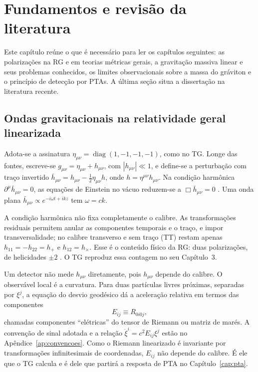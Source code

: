 \chapter{Fundamentos e revisão da literatura}
\label{cap:fundamentos}

Este capítulo reúne o que é necessário para ler os capítulos seguintes:
as polarizações na RG e em teorias métricas gerais, a gravitação
massiva linear e seus problemas conhecidos, os limites observacionais
sobre a massa do gráviton e o princípio de detecção por PTAs. A última
seção situa a dissertação na literatura recente.

\section{Ondas gravitacionais na relatividade geral linearizada}

Adota-se a assinatura $\eta_{\mu\nu}=\operatorname{diag}(1,-1,-1,-1)$,
como no TG. Longe das fontes, escreve-se
$g_{\mu\nu}=\eta_{\mu\nu}+h_{\mu\nu}$, com $|h_{\mu\nu}|\ll1$, e
define-se a perturbação com traço invertido
$\bar h_{\mu\nu}=h_{\mu\nu}-\frac12\eta_{\mu\nu}h$, onde
$h=\eta^{\mu\nu}h_{\mu\nu}$. Na condição harmônica
$\partial^\mu\bar h_{\mu\nu}=0$, as equações de Einstein no vácuo
reduzem-se a $\Box\bar h_{\mu\nu}=0$ \autocite{maggiore2008}. Uma onda
plana $\bar h_{\mu\nu}\propto e^{-i\omega t+ikz}$ tem $\omega=ck$.

A condição harmônica não fixa completamente o calibre. As
transformações residuais permitem anular as componentes temporais e o
traço, e impor transversalidade; no calibre transverso e sem traço (TT)
restam apenas $h_{11}=-h_{22}=h_+$ e $h_{12}=h_\times$. Esse é o
conteúdo físico da RG: duas polarizações, de helicidades $\pm2$
\autocite{maggiore2008}. O TG reproduz essa contagem no seu Capítulo~3.

Um detector não mede $h_{\mu\nu}$ diretamente, pois $h_{\mu\nu}$
depende do calibre. O observável local é a curvatura. Para duas
partículas livres próximas, separadas por $\xi^j$, a equação do desvio
geodésico dá a aceleração relativa em termos das componentes
\begin{equation}
 E_{ij}\equiv R_{0i0j},
 \label{eq:fund-marés}
\end{equation}
chamadas componentes ``elétricas'' do tensor de Riemann ou matriz de
marés. A convenção de sinal adotada e a relação
$\ddot\xi^i=c^2E_{ij}\xi^j$ estão no Apêndice~\ref{ap:convencoes}. Como
o Riemann linearizado é invariante por transformações infinitesimais de
coordenadas, $E_{ij}$ não depende do calibre. É ele que o TG calcula e é
dele que partirá a resposta de PTA no Capítulo~\ref{cap:pta}.

